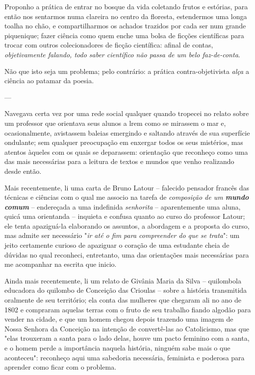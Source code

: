 Proponho a prática de entrar no bosque da vida coletando frutos e estórias, para então nos sentarmos numa clareira no centro da floresta, estendermos uma longa toalha no chão, e compartilharmos os achados trazidos por cada ser num grande piquenique;
    fazer ciência como quem enche uma bolsa de ficções científicas para trocar com outros colecionadores de ficção científica:
        afinal de contas, \textit{objetivamente falando, todo saber científico não passa de um belo faz-de-conta}.
    
Não que isto seja um problema;
    pelo contrário:
        a prática contra-objetivista \textit{alça} a ciência ao patamar da poesia.


---

Navegava certa vez por uma rede social qualquer quando tropecei no relato sobre um professor que orientava seus alunos a lrem como se mirassem o mar e, ocasionalmente, avistassem baleias emergindo e saltando através de sua superfície ondulante;
    sem qualquer preocupação em enxergar todos os seus mistérios, mas atentos àqueles com os quais se deparassem:
        orientação que reconheço como uma das mais necessárias para a leitura de textos e mundos que venho realizando desde então.

Mais recentemente, li uma carta de Bruno Latour -- falecido pensador francês das técnicas e ciências com o qual me associo na tarefa de \textit{composição de um \textbf{mundo comum}} -- endereçada a uma indefinida \textit{senhorita} -- aparentemente uma aluna, quicá uma orientanda -- inquieta e confusa quanto ao curso do professor Latour;
    ele tenta apaziguá-la elaborando os assuntos, a abordagem e a proposta do curso, mas admite ser necessário "\textit{ir até o fim para compreender do que se trata}":
        um jeito certamente curioso de apaziguar o coração de uma estudante cheia de dúvidas no qual reconheci, entretanto, uma das orientações mais necessárias para me acompanhar na escrita que inicio.

Ainda mais recentemente, li um relato de Givânia Maria da Silva -- quilombola educadora do quilombo de Conceição das Crioulas -- sobre a história transmitida oralmente de seu território;
    ela conta das mulheres que chegaram ali no ano de 1802 e compraram aquelas terras com o fruto de seu trabalho fiando algodão para vender na cidade, e que um homem chegou depois trazendo uma imagem de Nossa Senhora da Conceição na intenção de convertê-las ao Catolicismo, mas que "elas trouxeram a santa para o lado delas, houve um pacto feminino com a santa, e o homem perde a importância naquela história, ninguém sabe mais o que aconteceu":
        reconheço aqui uma sabedoria necessária, feminista e poderosa para aprender como ficar com o problema.

